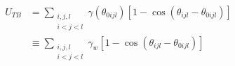 \documentclass[preview]{standalone}
\begin{document}
\begin{align*}
U_{TB} &= \sum_{\substack{i,j,l \\ i<j<l}}
            \gamma(\theta_{0ijl})
            \left[1-\cos(\theta_{ijl}-\theta_{0ijl})\right] \\
            &\equiv \sum_{\substack{i,j,l \\ i<j<l}}
            \gamma_{w}
            \left[1-\cos(\theta_{ijl}-\theta_{0ijl})\right]
\end{align*}
\end{document}
